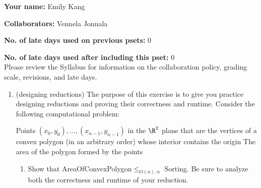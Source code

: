 \documentclass[11pt]{article}
\begin{document}

\textbf{Your name: } Emily Kang

\textbf{Collaborators: } Vennela Jonnala

\textbf{No. of late days used on previous psets: } 0

\textbf{No. of late days used after including this pset: } 0
\\

Please review the Syllabus for information on the collaboration 
policy, grading scale, revisions, and late days.

\begin{enumerate}
     \item  (designing reductions) 
     The purpose of this exercise is to give you practice designing reductions and proving their correctness and runtime.
    Consider the following computational problem:

    {Points $(x_0,y_0),\ldots,(x_{n-1},y_{n-1})$ in the $\R^2$ plane that are the vertices of a convex polygon (in an arbitrary order) whose interior contains the origin}
    {The area of the polygon formed by the points}


    \begin{enumerate}
        \item \label{part:polar} 
        Show that AreaOfConvexPolygon$\leq_{O(n),n}$ Sorting.  Be sure to analyze both the correctness and runtime of your reduction.


\end{enumerate}
\end{enumerate}
\end{document}
